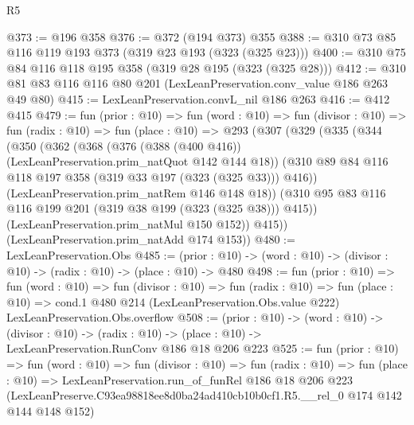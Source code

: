 \begin{lexlean}{R5}
\begin{coremodule}
@373 := @196 @358
@376 := @372 (@194 @373) @355
@388 := @310 @73 @85 @116 @119 @193 @373 (@319 @23 @193 (@323 (@325 @23)))
@400 := @310 @75 @84 @116 @118 @195 @358 (@319 @28 @195 (@323 (@325 @28)))
@412 := @310 @81 @83 @116 @116 @80 @201 (LexLeanPreservation.conv_value @186 @263 @49 @80)
@415 := LexLeanPreservation.convL_nil @186 @263
@416 := @412 @415
@479 := fun (prior : @10) =>
  fun (word : @10) =>
  fun (divisor : @10) =>
  fun (radix : @10) =>
  fun (place : @10) =>
  @293
    (@307
      (@329
        (@335
          (@344
            (@350
              (@362
                (@368
                  (@376 (@388 (@400 @416)) (LexLeanPreservation.prim_natQuot @142 @144 @18))
                  (@310 @89 @84 @116 @118 @197 @358 (@319 @33 @197 (@323 (@325 @33))) @416))
                (LexLeanPreservation.prim_natRem @146 @148 @18))
              (@310 @95 @83 @116 @116 @199 @201 (@319 @38 @199 (@323 (@325 @38))) @415))
            (LexLeanPreservation.prim_natMul @150 @152))
          @415))
      (LexLeanPreservation.prim_natAdd @174 @153))
@480 := LexLeanPreservation.Obs
@485 := (prior : @10) -> (word : @10) -> (divisor : @10) -> (radix : @10) -> (place : @10) -> @480
@498 := fun (prior : @10) =>
  fun (word : @10) =>
  fun (divisor : @10) =>
  fun (radix : @10) =>
  fun (place : @10) =>
  cond.{1} @480 @214 (LexLeanPreservation.Obs.value @222) LexLeanPreservation.Obs.overflow
@508 := (prior : @10) ->
  (word : @10) ->
  (divisor : @10) ->
  (radix : @10) -> (place : @10) -> LexLeanPreservation.RunConv @186 @18 @206 @223
@525 := fun (prior : @10) =>
  fun (word : @10) =>
  fun (divisor : @10) =>
  fun (radix : @10) =>
  fun (place : @10) =>
  LexLeanPreservation.run_of_funRel
    @186
    @18
    @206
    @223
    (LexLeanPreserve.C93ea98818ee8d0ba24ad410cb10b0cf1.R5.__rel_0 @174 @142 @144 @148 @152)
\end{coremodule}
\end{lexlean}
